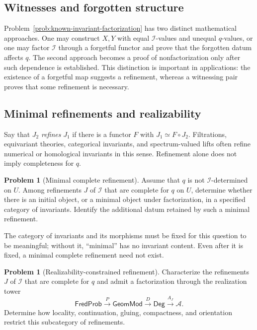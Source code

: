 \documentclass[11pt,letterpaper,twoside]{article}
\theoremstyle{plain}
\theoremstyle{definition}
\newtheorem{problem}[theorem]{Problem}
\theoremstyle{remark}
\newcommand{\Deg}{\mathsf{Deg}}
\newcommand{\GeomMod}{\mathsf{GeomMod}}
\newcommand{\FredProb}{\mathsf{FredProb}}
\begin{document}
\subsection{Witnesses and forgotten structure}

Problem~\ref{prob:known-invariant-factorization} has two distinct mathematical approaches.  One may construct \(X,Y\) with equal \(\mathcal I\)-values and unequal \(q\)-values, or one may factor \(\mathcal I\) through a forgetful functor and prove that the forgotten datum affects \(q\).  The second approach becomes a proof of nonfactorization only after such dependence is established.  This distinction is important in applications: the existence of a forgetful map suggests a refinement, whereas a witnessing pair proves that some refinement is necessary.

\subsection{Minimal refinements and realizability}

Say that \(J_2\) \emph{refines} \(J_1\) if there is a functor \(F\) with \(J_1\simeq F\circ J_2\).  Filtrations, equivariant theories, categorical invariants, and spectrum-valued lifts often refine numerical or homological invariants in this sense.  Refinement alone does not imply completeness for \(q\).

\begin{problem}[Minimal complete refinement]\label{prob:minimal-refinement}
Assume that \(q\) is not \(\mathcal I\)-determined on \(U\).  Among refinements \(J\) of \(\mathcal I\) that are complete for \(q\) on \(U\), determine whether there is an initial object, or a minimal object under factorization, in a specified category of invariants.  Identify the additional datum retained by such a minimal refinement.
\end{problem}

The category of invariants and its morphisms must be fixed for this question to be meaningful; without it, ``minimal'' has no invariant content.  Even after it is fixed, a minimal complete refinement need not exist.

\begin{problem}[Realizability-constrained refinement]\label{prob:realizable-refinement}
Characterize the refinements \(J\) of \(\mathcal I\) that are complete for \(q\) and admit a factorization through the realization tower
\[
 \FredProb\xrightarrow{P}\GeomMod\xrightarrow{D}\Deg\xrightarrow{A_J}\mathcal A.
\]
Determine how locality, continuation, gluing, compactness, and orientation restrict this subcategory of refinements.
\end{problem}
\end{document}
